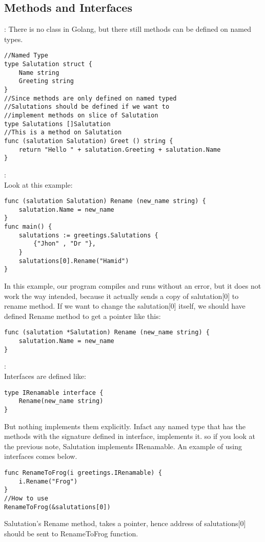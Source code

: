 \subsection{Methods and Interfaces}
\begin{note}[Methods]:
There is no class in Golang, but there still methods can be defined on named types.
\begin{lstlisting}[language=Golang]
//Named Type
type Salutation struct {
	Name string
	Greeting string
}
//Since methods are only defined on named typed
//Salutations should be defined if we want to
//implement methods on slice of Salutation
type Salutations []Salutation
//This is a method on Salutation
func (salutation Salutation) Greet () string {
	return "Hello " + salutation.Greeting + salutation.Name
}
\end{lstlisting}
\end{note}
\begin{note}:\\
Look at this example:
\begin{lstlisting}[language=Golang]
func (salutation Salutation) Rename (new_name string) {
	salutation.Name = new_name
}
func main() {
	salutations := greetings.Salutations {
		{"Jhon" , "Dr "},
	}
	salutations[0].Rename("Hamid")
}
\end{lstlisting}
In this example, our program compiles and runs without an error, but it does not work the way intended, because it actually sends a copy of salutation[0] to rename method. If we want to change the salutation[0] itself, we should have defined Rename method to get a pointer like this:
\begin{lstlisting}[language=Golang]
func (salutation *Salutation) Rename (new_name string) {
	salutation.Name = new_name
}
\end{lstlisting}
\end{note}
\begin{note}[Interfaces]:\\
Interfaces are defined like:
\begin{lstlisting}[language=Golang]
type IRenamable interface {
	Rename(new_name string)
}
\end{lstlisting}
But nothing implements them explicitly. Infact any named type that has the methods with the signature defined in interface, implements it. so if you look at the previous note, Salutation implements IRenamable. An example of using interfaces comes below.
\begin{lstlisting}[language=Golang]
func RenameToFrog(i greetings.IRenamable) {
	i.Rename("Frog")
}
//How to use
RenameToFrog(&salutations[0])
\end{lstlisting}
Salutation's Rename method, takes a pointer, hence address of salutations[0] should be sent to RenameToFrog function.
\end{note}
